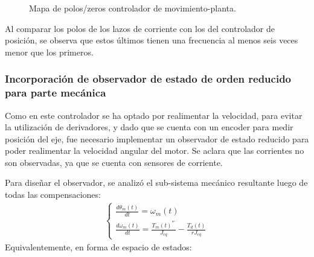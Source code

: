 \documentclass[a4paper, 10pt, onecolumn,journal]{ieeeconf}
\begin{document}
\begin{figure}[H]
	\centering
	\begin{adjustbox}{max width=\columnwidth}
	\end{adjustbox}
	\caption{Mapa de polos/zeros controlador de movimiento-planta.}
	\label{mapa de polos-ceros controlador-planta}
\end{figure}

Al comparar los polos de los lazos de corriente con los del controlador de posición, se observa que estos últimos tienen una frecuencia al menos seis veces menor que los primeros.


\subsubsection{\textbf{Incorporación de observador de estado de orden reducido para parte mecánica}}
Como en este controlador se ha optado por realimentar la velocidad, para evitar la utilización de derivadores, y dado que se cuenta con un encoder para medir posición del eje, fue necesario implementar un observador de estado reducido para poder realimentar la velocidad angular del motor. Se aclara que las corrientes no son observadas, ya que se cuenta con sensores de corriente.

Para diseñar el observador, se analizó el sub-sistema mecánico resultante luego de todas las compensaciones:
\begin{align}
	\begin{cases}
		\frac{d\theta_m(t)}{dt} ={\omega}_m(t)\\
		\frac{d\omega_m(t)}{dt} = \frac{{T_m(t)}^{*'}}{ J_{eq}}- \frac{T_d(t)}{r J_{eq}}
	\end{cases}\label{ecuacion de subsistema mecanico compensado}
\end{align}
 Equivalentemente, en forma de espacio de estados:
 
\end{document}
